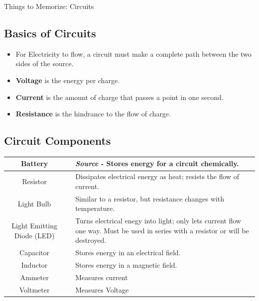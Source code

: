 \documentclass[letterpaper, 12pt]{article}
\begin{document}
	


\begin{center}Things to Memorize: Circuits
\end{center}

\subsection*{Basics of Circuits}
\begin{itemize}
	\item For Electricity to flow, a circuit must make a complete path between the two sides of the source. 
	\item \textbf{Voltage} is the energy per charge.
	\item \textbf{Current} is the amount of charge that passes a point in one second. 
	\item \textbf{Resistance} is the hindrance to the flow of charge.
\end{itemize}
\subsection*{Circuit Components}
\begin{center}
	\begin{tabular}{|c | p{1in} | p{3.5in}  |}
		\hline
		Battery & \vspace{0.5in} &  \textit{Source} - Stores energy for a circuit chemically. \\ \hline
		Resistor &\vspace{0.5in}   &  Dissipates electrical energy as heat; resists the flow of current.    \\ \hline
		Light Bulb & \vspace{0.5in}  & Similar to a resistor, but resistance changes with temperature. \\ \hline
		Light Emitting Diode (LED) &  \vspace{0.5in}  & Turns electrical enegy into light; only lets current flow one way.  Must be used in series with a resistor or will be destroyed.  \\ \hline
		Capacitor &  \vspace{0.5in} & Stores energy in an electrical field.   \\ \hline
		Inductor & \vspace{0.5in} & Stores energy in a magnetic field. \\ \hline
		Ammeter & \vspace{0.5in} & Measures current \\ \hline 
		Voltmeter & \vspace{0.5in} & Measures Voltage \\ \hline		
	\end{tabular}
\end{center}
	
\end{document}
